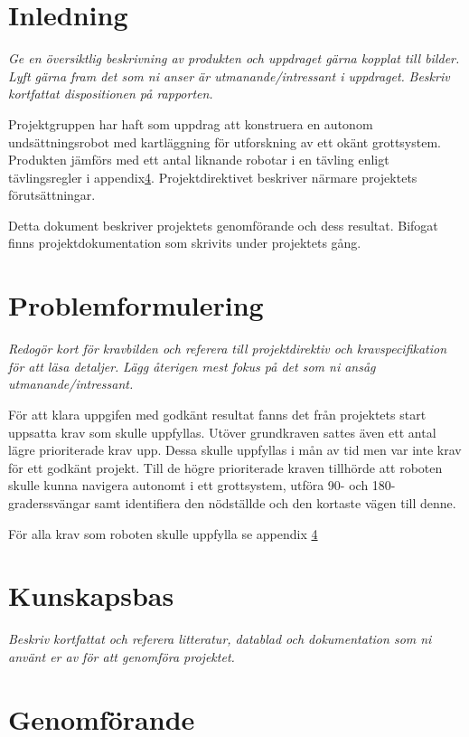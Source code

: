 \documentclass[11pt]{article}
\begin{document}
\begin{flushleft}
\section{Inledning}
\textit{Ge en översiktlig beskrivning av produkten och uppdraget gärna kopplat till bilder.}
\textit{Lyft gärna fram det som ni anser är utmanande/intressant i uppdraget.}
\textit{Beskriv kortfattat dispositionen på rapporten.}

Projektgruppen har haft som uppdrag att konstruera en autonom undsättningsrobot med kartläggning för utforskning av ett okänt grottsystem. Produkten jämförs med ett antal liknande robotar i en tävling enligt  tävlingsregler i appendix\ref{}. Projektdirektivet beskriver närmare projektets förutsättningar. 

Detta dokument beskriver projektets genomförande och dess resultat. Bifogat finns projektdokumentation som skrivits under projektets gång.

\pagebreak

\section{Problemformulering}
\textit{Redogör kort för kravbilden och referera till projektdirektiv och kravspecifikation för att läsa detaljer.}
\textit{Lägg återigen mest fokus på det som ni ansåg utmanande/intressant.}

För att klara uppgifen med godkänt resultat fanns det från projektets start uppsatta krav som skulle uppfyllas. Utöver grundkraven sattes även ett antal lägre prioriterade krav upp. Dessa skulle uppfyllas i mån av tid men var inte krav för ett godkänt projekt. Till de högre prioriterade kraven tillhörde att roboten skulle kunna navigera autonomt i ett grottsystem, utföra 90- och 180-graderssvängar samt identifiera den nödställde och den kortaste vägen till denne.

  För alla krav som roboten skulle uppfylla se appendix \ref{}
\pagebreak

\section{Kunskapsbas}
\textit{Beskriv kortfattat och referera litteratur, datablad och dokumentation som ni använt er av för att genomföra projektet.}

\pagebreak

\section{Genomförande}


\end{flushleft}
\end{document}
